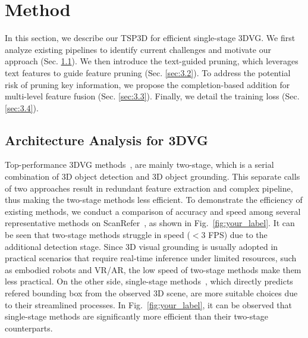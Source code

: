 \section{Method}
\label{sec:method}

In this section, we describe our TSP3D for efficient single-stage 3DVG. We first analyze existing pipelines to identify current challenges and motivate our approach (Sec. \ref{sec:3.1}). 
We then introduce the text-guided pruning, which leverages text features to guide feature pruning  (Sec. \ref{sec:3.2}). To address the potential risk of pruning key information, we propose the completion-based addition for multi-level feature fusion (Sec. \ref{sec:3.3}). Finally, we detail the training loss (Sec. \ref{sec:3.4}).

\subsection{Architecture Analysis for 3DVG}\label{sec:3.1}

Top-performance 3DVG methods~\citep{wang2024g,wu2023eda,shi2024aware}, are mainly two-stage, which is a serial combination of 3D object detection and 3D object grounding. This separate calls of two approaches result in redundant feature extraction and complex pipeline, thus making the two-stage methods less efficient. 
To demonstrate the efficiency of existing methods, we conduct a comparison of accuracy and speed among several representative methods on ScanRefer~\citep{chen2020scanrefer}, as shown in Fig.~\ref{fig:your_label}. 
It can be seen that two-stage methods struggle in speed ($<3$ FPS) due to the additional detection stage. Since 3D visual grounding is usually adopted in practical scenarios that require real-time inference under limited resources, such as embodied robots and VR/AR, the low speed of two-stage methods make them less practical.
On the other side, single-stage methods~\citep{luo20223d}, which directly predicts refered bounding box from the observed 3D scene, are more suitable choices due to their streamlined processes. In Fig.~\ref{fig:your_label}, it can be observed that single-stage methods are significantly more efficient than their two-stage counterparts.


